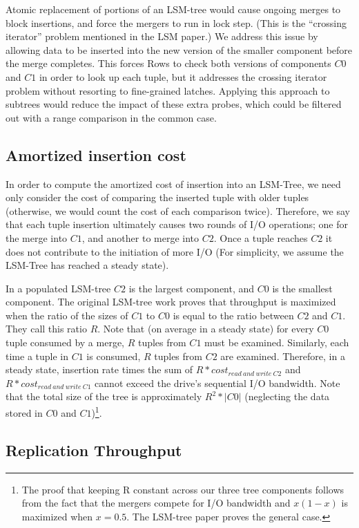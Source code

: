 \documentclass{sig-alternate-sigmod08}
\newcommand{\rows}{Rows\xspace}
\begin{document}
Atomic replacement of portions of an LSM-tree would cause ongoing
merges to block insertions, and force the mergers to run in lock step.
(This is the ``crossing iterator'' problem mentioned in the LSM
paper.)  We address this issue by allowing data to be inserted into
the new version of the smaller component before the merge completes.
This forces \rows to check both versions of components $C0$ and $C1$
in order to look up each tuple, but it addresses the crossing iterator
problem without resorting to fine-grained latches.  Applying this
approach to subtrees would reduce the impact of these extra probes,
which could be filtered out with a range comparison in the common
case.

\subsection{Amortized insertion cost}

In order to compute the amortized cost of insertion into an LSM-Tree,
we need only consider the cost of comparing the inserted tuple with
older tuples (otherwise, we would count the cost of each comparison
twice).  Therefore, we say that each tuple insertion ultimately causes
two rounds of I/O operations; one for the merge into $C1$, and another
to merge into $C2$.  Once a tuple reaches $C2$ it does not contribute
to the initiation of more I/O (For simplicity, we assume the LSM-Tree
has reached a steady state).

In a populated LSM-tree $C2$ is the largest component, and $C0$ is the
smallest component.  The original LSM-tree work proves that throughput
is maximized when the ratio of the sizes of $C1$ to $C0$ is equal to
the ratio between $C2$ and $C1$.  They call this ratio $R$.  Note that
(on average in a steady state) for every $C0$ tuple consumed by a
merge, $R$ tuples from $C1$ must be examined.  Similarly, each time a
tuple in $C1$ is consumed, $R$ tuples from $C2$ are examined.
Therefore, in a steady state, insertion rate times the sum of $R *
cost_{read~and~write~C2}$ and $R * cost_{read~and~write~C1}$ cannot
exceed the drive's sequential I/O bandwidth.  Note that the total size
of the tree is approximately $R^2 * |C0|$ (neglecting the data stored
in $C0$ and $C1$)\footnote{The proof that keeping R constant across
  our three tree components follows from the fact that the mergers
  compete for I/O bandwidth and $x(1-x)$ is maximized when $x=0.5$.
  The LSM-tree paper proves the general case.}.

\subsection{Replication Throughput}
\end{document}
